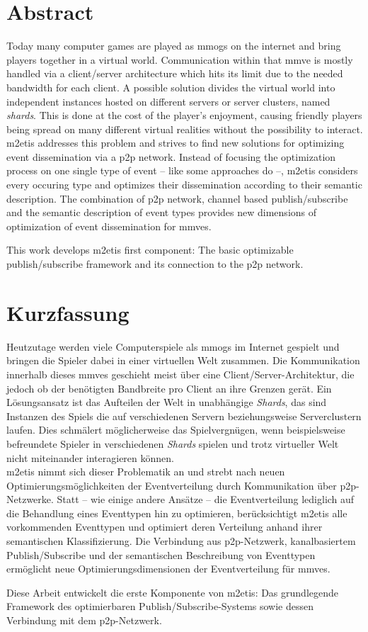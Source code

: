 \chapter*{Abstract}
Today many computer games are played as \acfp{mmog} on the internet and bring players together in a virtual world. Communication within that \acf{mmve} is mostly handled via a client/server architecture which hits its limit due to the needed bandwidth for each client. A possible solution divides the virtual world into independent instances hosted on different servers or server clusters, named \emph{shards}. This is done at the cost of the player's enjoyment, causing friendly players being spread on many different virtual realities without the possibility to interact.\\
\acf{m2etis} addresses this problem and strives to find new solutions for optimizing event dissemination via a \acf{p2p} network. Instead of focusing the optimization process on one single type of event -- like some approaches do --, \ac{m2etis} considers every occuring type and optimizes their dissemination according to their semantic description. The combination of \ac{p2p} network, channel based publish/subscribe and the semantic description of event types provides new dimensions of optimization of event dissemination for \acp{mmve}.

This work develops \ac{m2etis} first component: The basic optimizable publish/subscribe framework and its connection to the \ac{p2p} network.


\clearpage{\pagestyle{empty}\cleardoublepage}
\chapter*{Kurzfassung}
Heutzutage werden viele Computerspiele als \acfp{mmog} im Internet gespielt und bringen die Spieler dabei in einer virtuellen Welt zusammen. Die Kommunikation innerhalb dieses \acfp{mmve} geschieht meist über eine Client/Server-Architektur, die jedoch ob der benötigten Bandbreite pro Client an ihre Grenzen gerät. Ein Lösungsansatz ist das Aufteilen der Welt in unabhängige \emph{Shards}, das sind Instanzen des Spiels die auf verschiedenen Servern beziehungsweise Serverclustern laufen. Dies schmälert möglicherweise das Spielvergnügen, wenn beispielsweise befreundete Spieler in verschiedenen \emph{Shards} spielen und trotz virtueller Welt nicht miteinander interagieren können.\\
\acf{m2etis} nimmt sich dieser Problematik an und strebt nach neuen Optimierungsmöglichkeiten der Eventverteilung durch Kommunikation über \acf{p2p}-Netzwerke. Statt -- wie einige andere Ansätze -- die Eventverteilung lediglich auf die Behandlung eines Eventtypen hin zu optimieren, berücksichtigt \ac{m2etis} alle vorkommenden Eventtypen und optimiert deren Verteilung anhand ihrer semantischen Klassifizierung. Die Verbindung aus \ac{p2p}-Netzwerk, kanalbasiertem Publish/Subscribe und der semantischen Beschreibung von Eventtypen ermöglicht neue Optimierungsdimensionen der Eventverteilung für \acp{mmve}.

Diese Arbeit entwickelt die erste Komponente von \ac{m2etis}: Das grundlegende Framework des optimierbaren Publish/Subscribe-Systems sowie dessen Verbindung mit dem \ac{p2p}-Netzwerk.
